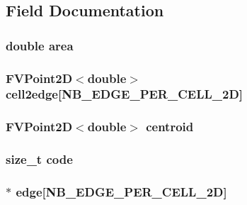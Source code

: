\subsection{Field Documentation}
\hypertarget{classFVCell2D_ae517bffd82b9428b4f1d9500ea01c04f}{
\subsubsection[{area}]{\setlength{\rightskip}{0pt plus 5cm}double {\bf area}}}
\label{da/da3/classFVCell2D_ae517bffd82b9428b4f1d9500ea01c04f}
\hypertarget{classFVCell2D_a99bffb94997ba2dc39e4184c17166cce}{
\subsubsection[{cell2edge}]{\setlength{\rightskip}{0pt plus 5cm}FVPoint2D$<$double$>$ {\bf cell2edge}\mbox{[}NB\_\-EDGE\_\-PER\_\-CELL\_\-2D\mbox{]}}}
\label{da/da3/classFVCell2D_a99bffb94997ba2dc39e4184c17166cce}
\hypertarget{classFVCell2D_ab3ed78ad91cf05def39147f46817c454}{
\subsubsection[{centroid}]{\setlength{\rightskip}{0pt plus 5cm}FVPoint2D$<$double$>$ {\bf centroid}}}
\label{da/da3/classFVCell2D_ab3ed78ad91cf05def39147f46817c454}
\hypertarget{classFVCell2D_acf258c3b3328a96e3ee1e3b875b7874f}{
\subsubsection[{code}]{\setlength{\rightskip}{0pt plus 5cm}size\_\-t {\bf code}}}
\label{da/da3/classFVCell2D_acf258c3b3328a96e3ee1e3b875b7874f}
\hypertarget{classFVCell2D_aaef61084c7d087b06124b4e122b26eba}{
\subsubsection[{edge}]{$\ast$ {\bf edge}\mbox{[}NB\_\-EDGE\_\-PER\_\-CELL\_\-2D\mbox{]}}}
\label{da/da3/classFVCell2D_aaef61084c7d087b06124b4e122b26eba}
